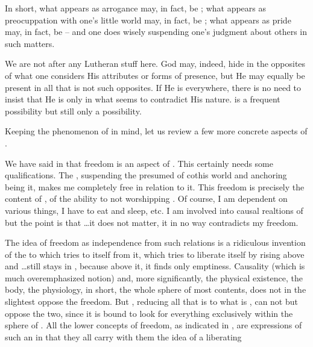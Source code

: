 In short, what appears as arrogance may, in fact, be ; what
appears as preocuppation with one's little world may, in fact, be ;
what appears as pride may, in fact, be  -- and one does wisely
suspending one's judgment about others in such matters.

\say
We are not after any Lutheran stuff here. God may, indeed, hide in the opposites
of what one considers His attributes or forms of presence, but He may equally be
present in all that is not such opposites. If He is everywhere, there is no need
to insist that He is only in what seems to contradict His nature. 
is a frequent possibility but still only a possibility. 

Keeping the phenomenon of  in mind, let us review a few more
concrete aspects of . 

\label{pa:invfreedom}
We have said in  that
freedom is an aspect of .  This certainly needs some
qualifications.  The \yes, suspending the presumed 
of co{this world} and anchoring  being  it, makes me
completely free in relation to it.  This freedom is precisely the
content of , of the ability to not worshipping
.  Of course, I am dependent on various things, I have to
eat and sleep, etc.  I am involved into causal realtions of  but the point is that \ldots it does not matter, it in no way
contradicts my freedom.

The idea of freedom as independence from such relations is a
ridiculous invention of the  to  which
tries to  itself from it, which tries to liberate itself by
rising above  and \ldots still stays in , because above it, it finds only emptiness.  Causality (which
is much overemphasized notion) and, more significantly, the physical
existence, the body, the physiology, in short, the whole sphere of
most  contents, does not in the slightest oppose the
freedom. But , reducing all that is to what is ,
 can not but oppose the two, since it is bound to look for everything
 exclusively within the sphere of .   All
the lower concepts of freedom, as indicated in ,
are expressions of such an  in that they all carry with
them the idea of a liberating 

